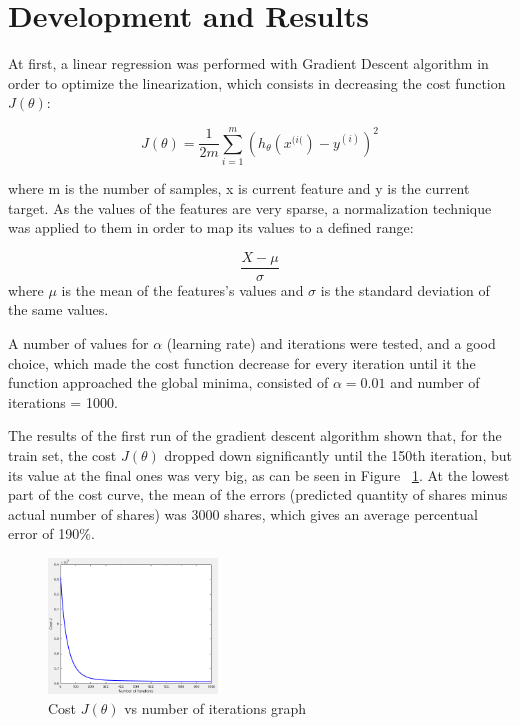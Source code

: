 \documentclass[10pt,twocolumn,letterpaper]{article}
\begin{document}
\section{Development and Results}
At first, a linear regression was performed with Gradient Descent algorithm in order to optimize the linearization, which consists in decreasing the cost function $J(\theta)$:

\begin{equation}\label{eq:gdcost}
J(\theta) = \frac{1}{2m} \sum\limits_{i=1}^m  (h_{\theta}(x^{(i(})-y^{(i)})^{2}
\end{equation}

where m is the number of samples, x is current feature and y is the current target.
As the values of the features are very sparse, a normalization technique was applied to them in order to map its values to a defined range:

\begin{equation}\label{eq:normalization}
\dfrac{X - \mu}{\sigma}
\end{equation}
where $\mu$ is the mean of the features's values and $\sigma$ is the standard deviation of the same values.

A number of values for $\alpha$ (learning rate) and iterations were tested, and a good choice, which made the cost function decrease for every iteration until it the function approached the global minima, consisted of $\alpha = 0.01$ and number of iterations = 1000.

The results of the first run of the gradient descent algorithm shown that, for the train set, the cost $J(\theta)$ dropped down significantly until the 150th iteration, but its value at the final ones was very big, as can be seen in Figure ~\ref{fig:first_run_label}. At the lowest part of the cost curve, the mean of the errors (predicted quantity of shares minus actual number of shares) was 3000 shares, which gives an average percentual error of 190$\%$.

\begin{figure}[H]
\begin{center}
	\includegraphics[width=0.4\textwidth]{pics/first_run_001_1000}
	\caption{Cost $J(\theta)$ vs number of iterations graph\label{fig:first_run_label}}   
\end{center} 
\end{figure}   
\end{document}
